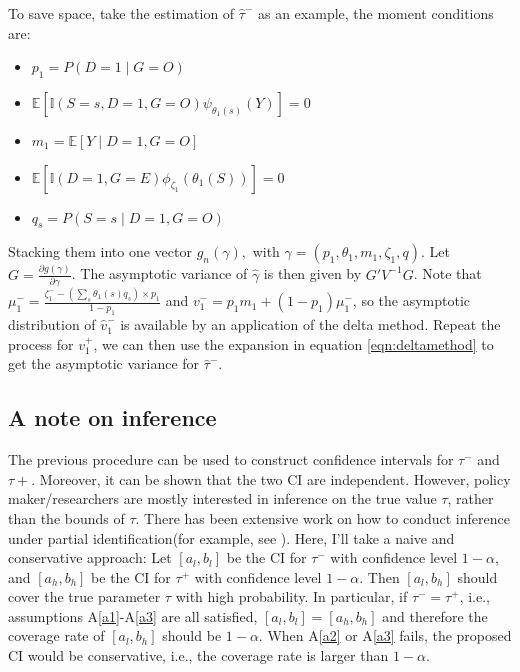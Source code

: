 \documentclass[12pt]{article}
\newcommand{\Indc}{\mathbb{I}}
\begin{document}
    To save space, take the estimation of $\hat{\tau}^-$ as an example, the moment conditions are: 
	\begin{itemize}
	    \item 	$p_1 = P(D = 1 \mid G = O)$
	    
	    \item $\mathbb{E}\left[\mathbb{I}(S=s, D=1, G = O) \psi_{\theta_1(s)}(Y)\right]  = 0$
	    
        \item $m_1 = \mathbb{E}[Y \mid D = 1, G = O]$
        
        \item $\mathbb{E}\left[\Indc(D=1,G=E)\phi_{{\zeta}_1}(\theta_1(S))\right] = 0$
        
        \item $q_s = P(S=s \mid D=1, G=O)$
	\end{itemize}
	Stacking them into one vector $g_n(\gamma), $ with $\gamma = (p_1, \theta_1, m_1, \zeta_1, q)$. Let $G = \frac{\partial g(\gamma)}{\partial \gamma}$. The asymptotic variance of $\hat{\gamma}$ is then given by $G'V^{-1}G$. Note that $\mu_1^- = \frac{\zeta_1^- - (\sum_s \theta_1(s) q_s)  \times p_1}{1 - p_1}$ and $v_1^- = p_1 m_1 + (1 - p_1) \mu_1^- $, so the asymptotic distribution of $\hat{v}_1^-$ is available by an application of the delta method. Repeat the process for $v_1^+$, we can then use the expansion in equation \ref{eqn:deltamethod} to get the asymptotic variance for $\hat{\tau}^-.$
	
	\subsection{A note on inference}
	The previous procedure can be used to construct confidence intervals for $\tau^-$ and $\tau+$. 
    Moreover, it can be shown that the two CI are independent. 
    However, policy maker/researchers are mostly interested in inference on the true value $\tau$, rather than the bounds of $\tau$. 
    There has been extensive work on how to conduct inference under partial identification(for example, see \textcite{Andrews2007InferenceFP, stoye2020simple}). 
    Here, I'll take a naive and conservative approach: Let $[a_l, b_l]$ be the CI for $\tau^-$ with confidence level $1 - \alpha$, and $[a_h, b_h]$ be the CI for $\tau^+$ with confidence level $1 - \alpha$. 
    Then $[a_l, b_h]$ should cover the true parameter $\tau$ with high probability. 
    In particular, if $\tau^- = \tau^+$, i.e., assumptions A\ref{a1}-A\ref{a3} are all satisfied, $[a_l, b_l] = [a_h, b_h]$ and therefore the coverage rate of $[a_l, b_h]$ should be $1 - \alpha$. 
    When A\ref{a2} or A\ref{a3} fails, the proposed CI would be conservative, i.e., the coverage rate is larger than $1 - \alpha$.
	
\end{document}
